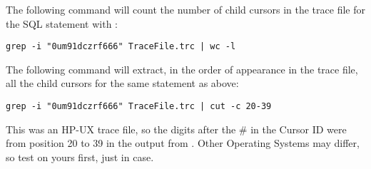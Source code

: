 The following command will count the number of child cursors in the trace file for the SQL statement with :

\begin{lstlisting}[numbers=none,caption={Counting Child Cursors in a Trace File}]
grep -i "0um91dczrf666" TraceFile.trc | wc -l
\end{lstlisting}

The following command will extract, in the order of appearance in the trace file, all the child cursors for the same statement as above:

\begin{lstlisting}[numbers=none,caption={Extracting Child Cursors from a Trace File}]
grep -i "0um91dczrf666" TraceFile.trc | cut -c 20-39
\end{lstlisting}

This was an HP-UX trace file, so the digits after the \# in the Cursor ID were from position 20 to 39 in the output from . Other Operating Systems may differ, so test on yours first, just in case.

